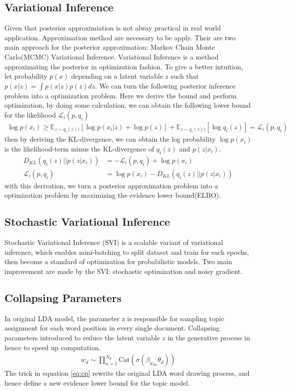 \subsection{Variational Inference}
Given that posterior approximiation is not alway practical in real world application. Approximation method are necessary to be apply. Their are two main approach for the posterior approximation: Markov Chain Monte Carlo(MCMC) Variational Inference. Variational Inference is a method approximating the posterior in optimization fashion. To give a better intuition, let probability $ p(x) $ depending on a latent variable $ z $ such that $ p(x|z)=\int p(x|z)p(z)dz $. We can turn the following posterior inference problem into a optimization problem. Here we derive the bound and perform optimization, by doing some calculation, we can obtain the following lower bound for the likelihood $ \mathcal{L}_i(p,q_i) $
\begin{align*}
\log p(x_i)\geq\mathbb{E}_{z\sim q_i(z))}[\log p(x_i|z)+\log p(z)]+\mathbb{E}_{z\sim q_i(z))}[\log q_i(z)]=\mathcal{L}_i(p,q_i)
\end{align*}
then by deriving the KL-divergence, we can obtain the log probability $ \log p(x_i) $ is the likelihood-term minus the KL-divergence of $ q_i(z) $ and $ p(z|x_i) $.
\begin{align*}
D_{KL}(q_i(z)||p(z|x_i))&=-\mathcal{L}_i(p,q_i)+\log p(x_i)\\
\mathcal{L}_i(p,q_i)&=\log p(x_i)-D_{KL}(q_i(z)||p(z|x_i))
\end{align*}
with this derivation, we turn a posterior approximation problem into a optimization problem by maximizing the evidence lower bound(ELBO).
\subsection{Stochastic Variational Inference}
Stochastic Variational Inference (SVI)\cite{hoffman_stochastic_2013} is a scalable variant of variational inference, which enables mini-batching to split dataset and train for each epochs, then become a standard of optimization for probabilistic models.
Two main improvement are made by the SVI: stochastic optimization and noisy gradient.
\subsection{Collapsing Parameters}
In original LDA model, the parameter z is responsible for sampling topic assignment for each word position in every single document. Collapsing parameters\cite{srivastava_autoencoding_2017} introduced to reduce the latent variable $ z $ in the generative process in hence to speed up computation.
\begin{align}\label{eq:cp}
w_d\sim\prod_{n=1}^{N_d}\text{Cat}(\sigma(\beta_{w_{dn}}\theta_d))
\end{align}
The trick in equation \ref{eq:cp} rewrite the original LDA word drawing process, and hence define a new evidence lower bound for the topic model.
